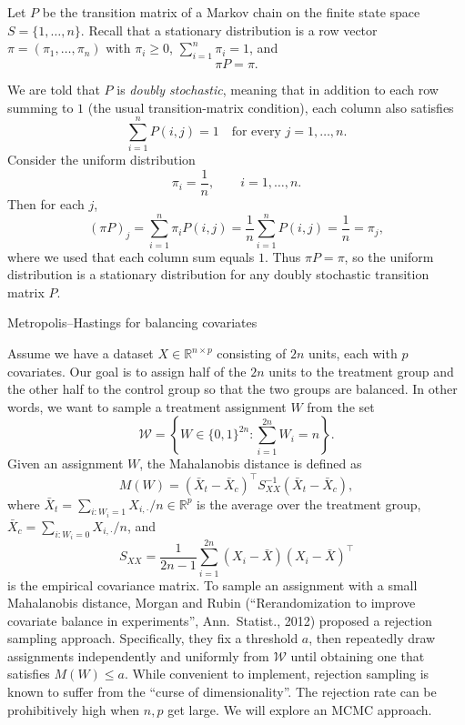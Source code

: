 \documentclass[answers,12pt,addpoints]{exam}
\begin{document}
\begin{questions}
\begin{solution}
Let $P$ be the transition matrix of a Markov chain on the finite state space
$S = \{1,\dots,n\}$. Recall that a stationary distribution is a row vector
$\pi = (\pi_1,\dots,\pi_n)$ with $\pi_i \ge 0$, $\sum_{i=1}^n \pi_i = 1$, and
\[
\pi P = \pi.
\]

We are told that $P$ is \emph{doubly stochastic}, meaning that in addition to
each row summing to $1$ (the usual transition-matrix condition), each column
also satisfies
\[
\sum_{i=1}^n P(i,j) = 1 \quad \text{for every } j=1,\dots,n.
\]
Consider the uniform distribution
\[
\pi_i = \frac{1}{n}, \qquad i=1,\dots,n.
\]
Then for each $j$,
\[
(\pi P)_j
= \sum_{i=1}^n \pi_i P(i,j)
= \frac{1}{n}\sum_{i=1}^n P(i,j)
= \frac{1}{n}
= \pi_j,
\]
where we used that each column sum equals $1$.
Thus $\pi P = \pi$, so the uniform distribution is a stationary distribution
for any doubly stochastic transition matrix $P$.
\end{solution}

\newpage

\question Metropolis--Hastings for balancing covariates

Assume we have a dataset \(X \in \mathbb{R}^{n \times p}\) consisting of \(2n\) units, each with \(p\) covariates. Our goal is to assign half of the \(2n\) units to the treatment group and the other half to the control group so that the two groups are balanced. In other words, we want to sample a treatment assignment \(W\) from the set
\[
\mathcal{W} = \left\{ W \in \{0,1\}^{2n} : \sum_{i=1}^{2n} W_i = n \right\}.
\]
Given an assignment \(W\), the Mahalanobis distance is defined as
\[
M(W) = (\bar{X}_t - \bar{X}_c)^\top S_{XX}^{-1} (\bar{X}_t - \bar{X}_c),
\]
where \(\bar{X}_t = \sum_{i:W_i=1} X_{i,\cdot}/n \in \mathbb{R}^p\) is the average over the treatment group, \(\bar{X}_c = \sum_{i:W_i=0} X_{i,\cdot}/n\), and
\[
S_{XX} = \frac{1}{2n-1} \sum_{i=1}^{2n} (X_i - \bar{X})(X_i - \bar{X})^\top
\]
is the empirical covariance matrix. To sample an assignment with a small Mahalanobis distance, Morgan and Rubin (``Rerandomization to improve covariate balance in experiments'', Ann.\ Statist., 2012) proposed a rejection sampling approach. Specifically, they fix a threshold \(a\), then repeatedly draw assignments independently and uniformly from $\mathcal{W}$ until obtaining one that satisfies \(M(W) \le a\). While convenient to implement, rejection sampling is known to suffer from the ``curse of dimensionality''. The rejection rate can be prohibitively high when \(n,p\) get large. We will explore an MCMC approach. 


\end{questions}
\end{document}
